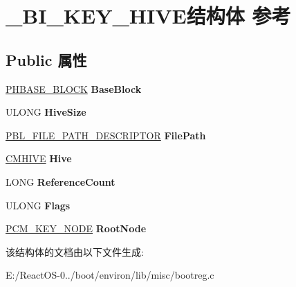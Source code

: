 \hypertarget{struct___b_i___k_e_y___h_i_v_e}{}\section{\+\_\+\+B\+I\+\_\+\+K\+E\+Y\+\_\+\+H\+I\+V\+E结构体 参考}
\label{struct___b_i___k_e_y___h_i_v_e}
\subsection*{Public 属性}
\begin{DoxyCompactItemize}
\item 
\mbox{\label{struct___b_i___k_e_y___h_i_v_e_afe84548681b294baa72304975208dbbd}} 
\hyperlink{struct___h_b_a_s_e___b_l_o_c_k}{P\+H\+B\+A\+S\+E\+\_\+\+B\+L\+O\+CK} {\bfseries Base\+Block}
\item 
\mbox{\label{struct___b_i___k_e_y___h_i_v_e_a9daec7dd6b705f67fccdd67803ed9436}} 
U\+L\+O\+NG {\bfseries Hive\+Size}
\item 
\mbox{\label{struct___b_i___k_e_y___h_i_v_e_a596dafd878ec5910aa126bf9e1ce9b37}} 
\hyperlink{struct___b_l___f_i_l_e___p_a_t_h___d_e_s_c_r_i_p_t_o_r}{P\+B\+L\+\_\+\+F\+I\+L\+E\+\_\+\+P\+A\+T\+H\+\_\+\+D\+E\+S\+C\+R\+I\+P\+T\+OR} {\bfseries File\+Path}
\item 
\mbox{\label{struct___b_i___k_e_y___h_i_v_e_a0f52c725fbb2e4c0a2858866f8ea9ee0}} 
\hyperlink{struct___c_m_h_i_v_e}{C\+M\+H\+I\+VE} {\bfseries Hive}
\item 
\mbox{\label{struct___b_i___k_e_y___h_i_v_e_a7d668fbe4058a8d5bba85e0aea38ef53}} 
L\+O\+NG {\bfseries Reference\+Count}
\item 
\mbox{\label{struct___b_i___k_e_y___h_i_v_e_a899a594a2031ae587150a909643c19cc}} 
U\+L\+O\+NG {\bfseries Flags}
\item 
\mbox{\label{struct___b_i___k_e_y___h_i_v_e_ad7e7557296b9d98c4e96eb41bfa657bf}} 
\hyperlink{struct___c_m___k_e_y___n_o_d_e}{P\+C\+M\+\_\+\+K\+E\+Y\+\_\+\+N\+O\+DE} {\bfseries Root\+Node}
\end{DoxyCompactItemize}


该结构体的文档由以下文件生成\+:\begin{DoxyCompactItemize}
\item 
E\+:/\+React\+O\+S-\/0../boot/environ/lib/misc/bootreg.\+c\end{DoxyCompactItemize}
